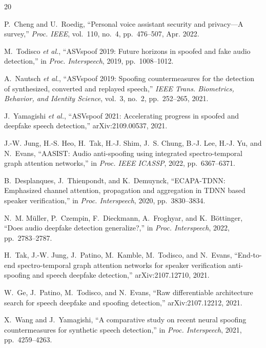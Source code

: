 \documentclass[conference]{IEEEtran}
\begin{document}
\begin{thebibliography}{20}
\footnotesize

P.~Cheng and U.~Roedig, ``Personal voice assistant security and privacy---A
survey,'' \emph{Proc. IEEE}, vol.~110, no.~4, pp.~476--507, Apr. 2022.

M.~Todisco \emph{et al.}, ``ASVspoof 2019: Future horizons in spoofed and fake
audio detection,'' in \emph{Proc. Interspeech}, 2019, pp.~1008--1012.

A.~Nautsch \emph{et al.}, ``ASVspoof 2019: Spoofing countermeasures for the
detection of synthesized, converted and replayed speech,'' \emph{IEEE Trans.
Biometrics, Behavior, and Identity Science}, vol.~3, no.~2, pp.~252--265, 2021.

J.~Yamagishi \emph{et al.}, ``ASVspoof 2021: Accelerating progress in spoofed
and deepfake speech detection,'' arXiv:2109.00537, 2021.

J.-W. Jung, H.-S. Heo, H.~Tak, H.-J. Shim, J.~S. Chung, B.-J. Lee, H.-J. Yu,
and N.~Evans, ``AASIST: Audio anti-spoofing using integrated spectro-temporal
graph attention networks,'' in \emph{Proc. IEEE ICASSP}, 2022,
pp.~6367--6371.

B.~Desplanques, J.~Thienpondt, and K.~Demuynck, ``ECAPA-TDNN: Emphasized
channel attention, propagation and aggregation in TDNN based speaker
verification,'' in \emph{Proc. Interspeech}, 2020, pp.~3830--3834.

N.~M. M\"uller, P.~Czempin, F.~Dieckmann, A.~Froghyar, and K.~B\"ottinger,
``Does audio deepfake detection generalize?,'' in \emph{Proc. Interspeech},
2022, pp.~2783--2787.

H.~Tak, J.-W. Jung, J.~Patino, M.~Kamble, M.~Todisco, and N.~Evans,
``End-to-end spectro-temporal graph attention networks for speaker verification
anti-spoofing and speech deepfake detection,'' arXiv:2107.12710, 2021.

W.~Ge, J.~Patino, M.~Todisco, and N.~Evans, ``Raw differentiable architecture
search for speech deepfake and spoofing detection,'' arXiv:2107.12212, 2021.

X.~Wang and J.~Yamagishi, ``A comparative study on recent neural spoofing
countermeasures for synthetic speech detection,'' in \emph{Proc. Interspeech},
2021, pp.~4259--4263.


\end{thebibliography}
\end{document}
